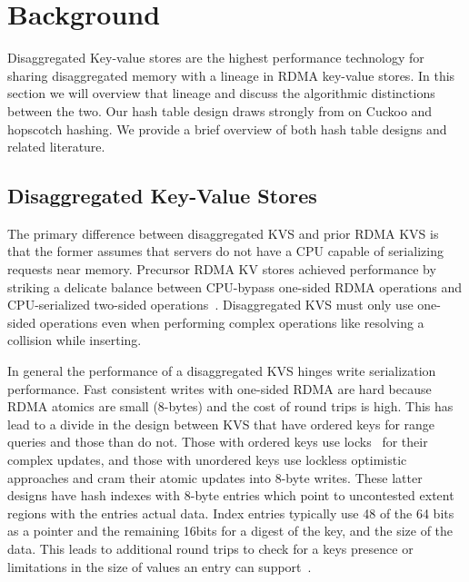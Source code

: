 
\section{Background}
\label{sec:background}

Disaggregated Key-value stores are the highest performance technology for sharing disaggregated
memory with a lineage in RDMA key-value stores. In this section we will overview that lineage and
discuss the algorithmic distinctions between the two. Our hash table design draws strongly from on
Cuckoo and hopscotch hashing. We provide a brief overview of both hash table designs and related
literature.



\subsection{Disaggregated Key-Value Stores}

The primary difference between disaggregated KVS and prior RDMA KVS is that the former assumes that
servers do not have a CPU capable of serializing requests near memory. Precursor RDMA KV stores
achieved performance by striking a delicate balance between CPU-bypass one-sided RDMA operations and
CPU-serialized two-sided operations~\cite{farm,herd,pilaf,cell,storm}. Disaggregated KVS must only
use one-sided operations even when performing complex operations like resolving a collision while
inserting.

In general the performance of a disaggregated KVS hinges write serialization performance.  Fast
consistent writes with one-sided RDMA are hard because RDMA atomics are small (8-bytes) and the cost
of round trips is high. This has lead to a divide in the design between KVS that have ordered keys
for range queries and those than do not. Those with ordered keys use locks~\cite{sherman,smart} for
their complex updates, and those with unordered keys use lockless optimistic approaches and cram
their atomic updates into 8-byte writes. These latter designs have hash indexes with 8-byte entries
which point to uncontested extent regions with the entries actual data. Index entries typically use
48 of the 64 bits as a pointer and the remaining 16bits for a digest of the key, and the size of the
data.  This leads to additional round trips to check for a keys presence or limitations in the size
of values an entry can support~\cite{fusee,race}.

